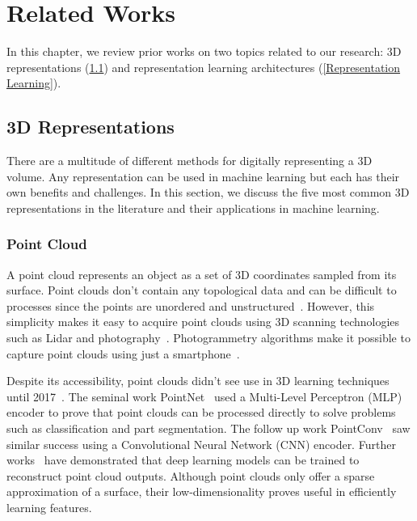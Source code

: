 
\chapter{Related Works}

In this chapter, we review prior works on two topics related to our research: 3D representations (\ref{3D Representations}) and representation learning architectures (\ref{Representation Learning}).

\section{3D Representations}
\label{3D Representations}

There are a multitude of different methods for digitally representing a 3D volume. Any representation can be used in machine learning but each has their own benefits and challenges. In this section, we discuss the five most common 3D representations in the literature and their applications in machine learning.

\subsection{Point Cloud}
\label{Point Cloud}

A point cloud represents an object as a set of 3D coordinates sampled from its surface. Point clouds don't contain any topological data and can be difficult to processes since the points are unordered and unstructured~\cite{Xiao2020}. However, this simplicity makes it easy to acquire point clouds using 3D scanning technologies such as Lidar and photography~\cite{Leberl2010}. Photogrammetry algorithms make it possible to capture point clouds using just a smartphone~\cite{Micheletti2015}.

Despite its accessibility, point clouds didn't see use in 3D learning techniques until 2017~\cite{Xiao2020}. The seminal work PointNet~\cite{Qi2017} used a Multi-Level Perceptron (MLP) encoder to prove that point clouds can be processed directly to solve problems such as classification and part segmentation. The follow up work PointConv~\cite{Wu2019} saw similar success using a Convolutional Neural Network (CNN) encoder. Further works~\cite{Fan2017, Achlioptas2018} have demonstrated that deep learning models can be trained to reconstruct point cloud outputs. Although point clouds only offer a sparse approximation of a surface, their low-dimensionality proves useful in efficiently learning features.



